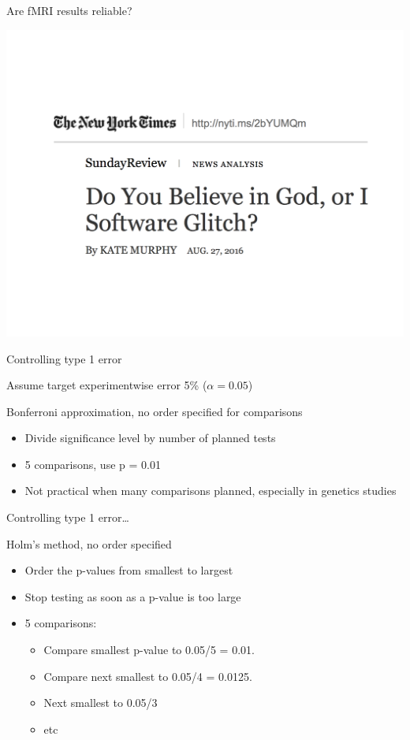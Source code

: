 \documentclass[ignorenonframetext,]{beamer}
\begin{document}
\begin{frame}{Are fMRI results reliable?}

\includegraphics{figures/fmri_errors_2.pdf}

\end{frame}

\begin{frame}{Controlling type 1 error}

Assume target experimentwise error 5\% (\(\alpha =0.05\)) \medskip

Bonferroni approximation, no order specified for comparisons

\begin{itemize}
\item
  Divide significance level by number of planned tests
\item
  5 comparisons, use p = 0.01
\item
  Not practical when many comparisons planned, especially in genetics
  studies
\end{itemize}

\end{frame}

\begin{frame}{Controlling type 1 error\ldots}

Holm's method, no order specified

\begin{itemize}
\item
  Order the p-values from smallest to largest
\item
  Stop testing as soon as a p-value is too large
\item
  5 comparisons:

  \begin{itemize}
  \item
    Compare smallest p-value to 0.05/5 = 0.01.
  \item
    Compare next smallest to 0.05/4 = 0.0125.
  \item
    Next smallest to 0.05/3
  \item
    etc
  \end{itemize}
\end{itemize}

\end{frame}
\end{document}
